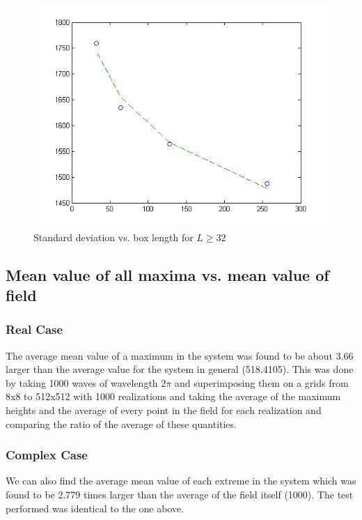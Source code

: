 \documentclass[12pt]{article}
\begin{document}
\begin{figure}[hpt]
	\centering
		\includegraphics[width=1.00\textwidth]{bcomplex-log.png}
	\caption{Standard deviation vs. box length for $L \geq 32$}
	\label{fig:bcomplex-log}
\end{figure}


\subsection{Mean value of all maxima vs. mean value of field}

\subsubsection{Real Case}

The average mean value of a maximum in the system was found to be about 3.66 larger than the average value for the system in general (518.4105). This was done by taking 1000 waves of wavelength $2 \pi$ and superimposing them on a grids from 8x8 to 512x512 with 1000 realizations and taking the average of the maximum heights and the average of every point in the field for each realization and comparing the ratio of the average of these quantities.

\subsubsection{Complex Case}

We can also find the average mean value of each extreme in the system which was found to be 2.779 times larger than the average of the field itself (1000). The test performed was identical to the one above.
\end{document}
